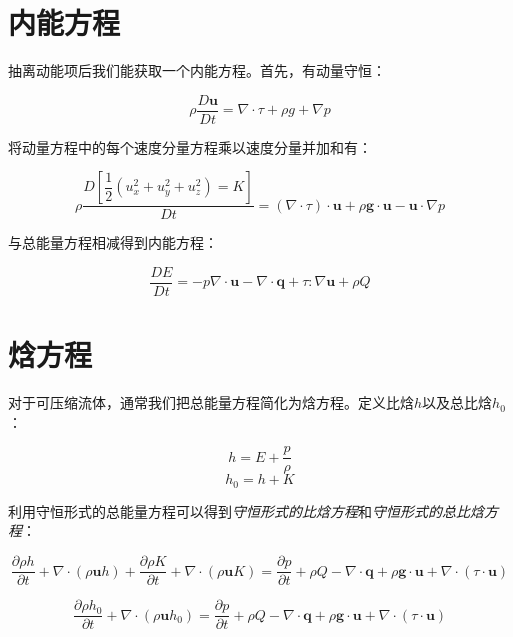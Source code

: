 \section{内能方程}

抽离动能项后我们能获取一个内能方程。首先，有动量守恒：

\begin{equation}
\rho \frac{D\mathbf{u}}{Dt} = \nabla\cdot\tau + \rho g + \nabla p
\end{equation}

将动量方程中的每个速度分量方程乘以速度分量并加和有：

\begin{equation}
\rho \frac{D \left[\dfrac{1}{2}\left(u_x^2+u_y^2+u_z^2 \right)= K\right]}{Dt}
=\left(\nabla \cdot \tau \right) \cdot \mathbf{u} + \rho \mathbf{g} \cdot \mathbf{u} -\mathbf{u} \cdot \nabla p
\end{equation}

与总能量方程相减得到内能方程：

\begin{equation}
\frac{DE}{Dt}
=-p\nabla \cdot \mathbf{u}-\nabla\cdot \mathbf{q} + \tau : \nabla \mathbf{u} + \rho Q
\end{equation}

\section{焓方程}

对于可压缩流体，通常我们把总能量方程简化为焓方程。定义比焓$ h $以及总比焓$ h_0 $：

\[ h = E+\frac{p}{\rho} \]
\[ h_0 = h+K \]

利用守恒形式的总能量方程可以得到\textit{守恒形式的比焓方程}和\textit{守恒形式的总比焓方程}：

\begin{equation}
\frac{\partial \rho h}{\partial t}+\nabla \cdot (\rho \mathbf{u} h) + \frac{\partial \rho K}{\partial t}+\nabla \cdot (\rho \mathbf{u} K) =\frac{\partial p}{\partial t}+ \rho Q - \nabla \cdot \mathbf{q} + \rho \mathbf{g} \cdot \mathbf{u}+\nabla \cdot(\tau \cdot \mathbf{u})
\end{equation}

\begin{equation}
\frac{\partial \rho h_0}{\partial t}+\nabla \cdot (\rho \mathbf{u} h_0) =\frac{\partial p}{\partial t}+ \rho Q - \nabla \cdot \mathbf{q} + \rho \mathbf{g} \cdot \mathbf{u}+\nabla \cdot(\tau \cdot \mathbf{u})
\end{equation}


